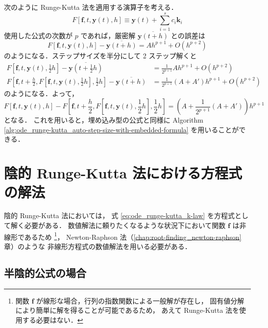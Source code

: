 次のように Runge-Kutta 法を適用する演算子を考える．
\begin{equation}
    F[\bm{f}, t, \bm{y}(t), h] \equiv \bm{y}(t) + \sum_{i=1}^s c_i \bm{k}_i
\end{equation}
使用した公式の次数が $p$ であれば，厳密解 $\overline{\bm{y}(t + h)}$ との誤差は
\begin{equation}
    F[\bm{f}, t, \bm{y}(t), h] - \overline{\bm{y}(t + h)} = A h^{p+1} + O(h^{p+2})
\end{equation}
のようになる．ステップサイズを半分にして 2 ステップ解くと
\begin{align}
    F\left[\bm{f}, t, \bm{y}(t), \frac{1}{2}h\right] - \overline{\bm{y}\left(t + \frac{1}{2}h\right)}
     & = \frac{1}{2^{p+1}} A h^{p+1} + O(h^{p+2})
    \\
    F\left[\bm{f}, t + \frac{h}{2}, F\left[\bm{f}, t, \bm{y}(t), \frac{1}{2}h\right], \frac{1}{2}h\right]
    - \overline{\bm{y}(t + h)}
     & = \frac{1}{2^{p+1}} (A + A') h^{p+1} + O(h^{p+2})
\end{align}
のようになる．よって，
\begin{equation}
    F[\bm{f}, t, \bm{y}(t), h]
    - F\left[\bm{f}, t + \frac{h}{2}, F\left[\bm{f}, t, \bm{y}(t), \frac{1}{2}h\right], \frac{1}{2}h\right]
    = \left(A + \frac{1}{2^{p+1}} (A + A')\right) h^{p+1}
\end{equation}
となる．
これを用いると，埋め込み型の公式と同様に
Algorithm \ref{alg:ode_runge-kutta_auto-step-size-with-embedded-formula}
を用いることができる．

\section{陰的 Runge-Kutta 法における方程式の解法}

陰的 Runge-Kutta 法においては，
式 \eqref{eq:ode_runge-kutta_k-law} を方程式として解く必要がある．
数値解法に頼りたくなるような状況下において関数 $\bm{f}$ は非線形であるため
\footnote{関数 $\bm{f}$ が線形な場合，行列の指数関数による一般解が存在し，%
    固有値分解により簡単に解を得ることが可能であるため，%
    あえて Runge-Kutta 法を使用する必要はない．}，
Newton-Raphson 法（\ref{chap:root-finding_newton-raphson} 章）のような
非線形方程式の数値解法を用いる必要がある．

\subsection{半陰的公式の場合}\label{sec:ode_runge-kutta_semi-implicit-equation-solving}

